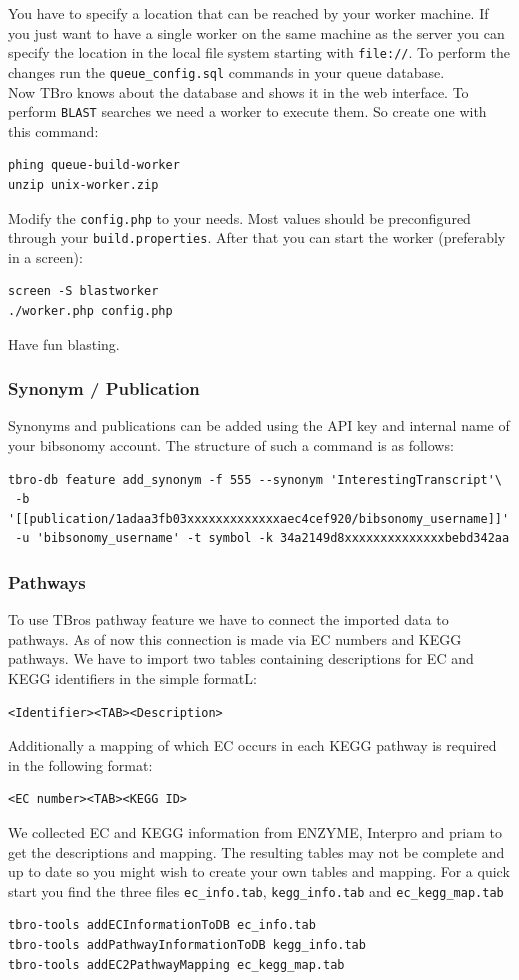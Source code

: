 \documentclass[english]{scrartcl}
\begin{document}
You have to specify a location that can be reached by your worker machine. If
you just want to have a single worker on the same machine as the server you can
specify the location in the local file system starting with \texttt{file://}.
To perform the changes run the \texttt{queue\_config.sql} commands in your queue
database.\\
Now TBro knows about the database and shows it in the web interface. To perform
\texttt{BLAST} searches we need a worker to execute them. So create one with
this command:
\begin{lstlisting}
phing queue-build-worker
unzip unix-worker.zip
\end{lstlisting}
Modify the \texttt{config.php} to your needs. Most values should be preconfigured through
your \texttt{build.properties}. After that you can start the worker (preferably in a
screen):
\begin{lstlisting}
screen -S blastworker
./worker.php config.php
\end{lstlisting}
Have fun blasting.

\subsubsection{Synonym / Publication}
Synonyms and publications can be added using the API key and internal name of
your bibsonomy account. The structure of such a command is as follows:
\begin{lstlisting}
tbro-db feature add_synonym -f 555 --synonym 'InterestingTranscript'\ 
 -b '[[publication/1adaa3fb03xxxxxxxxxxxxxaec4cef920/bibsonomy_username]]'
 -u 'bibsonomy_username' -t symbol -k 34a2149d8xxxxxxxxxxxxxxbebd342aa
\end{lstlisting}

\subsubsection{Pathways}
To use TBros pathway feature we have to connect the imported data to
pathways. As of now this connection is made via EC numbers and KEGG pathways. We
have to import two tables containing descriptions for EC and KEGG identifiers in
the simple formatL:
\begin{lstlisting}
<Identifier><TAB><Description>
\end{lstlisting}
Additionally a mapping of which EC occurs in each KEGG pathway is required in
the following format:
\begin{lstlisting}
<EC number><TAB><KEGG ID>
\end{lstlisting}
We collected EC and KEGG information from ENZYME, Interpro
and priam to get the descriptions and mapping. The resulting tables may not be complete
and up to date so you might wish to create your own tables and mapping.
For a quick start you find the three files \texttt{ec\_info.tab},
\texttt{kegg\_info.tab} and \texttt{ec\_kegg\_map.tab}
\begin{lstlisting}
tbro-tools addECInformationToDB ec_info.tab
tbro-tools addPathwayInformationToDB kegg_info.tab
tbro-tools addEC2PathwayMapping ec_kegg_map.tab
\end{lstlisting}
\end{document}
